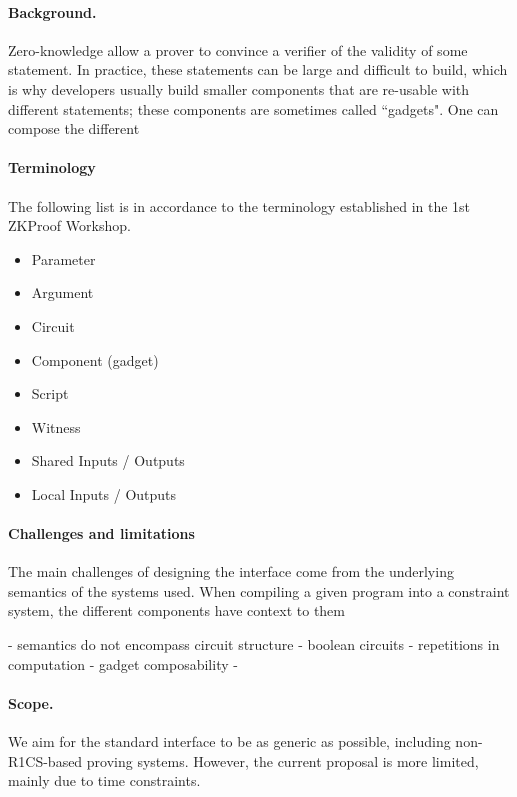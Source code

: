 \documentclass[a4paper,11pt]{article}
\begin{document}
		\paragraph{Background.} Zero-knowledge allow a prover to convince a verifier of the validity of some statement. In practice, these statements can be large and difficult to build, which is why developers usually build smaller components that are re-usable with different statements; these components are sometimes called ``gadgets". One can compose the different 
		
		
		\paragraph{Terminology}
		The following list is in accordance to the terminology established in the 1st ZKProof Workshop.
		
		\begin{itemize}
			\item Parameter
			\item Argument
			\item Circuit
			\item Component (gadget)
			\item Script
			\item Witness
			\item Shared Inputs / Outputs
			\item Local Inputs / Outputs
			
		\end{itemize}
		
		
		\paragraph{Challenges and limitations}
		
		The main challenges of designing the interface come from the underlying semantics of the systems used. When compiling a given program into a constraint system, the different components have context to them
		
		- semantics do not encompass circuit structure
			- boolean circuits
			- repetitions in computation
		- gadget composability
		- 
		
		\paragraph{Scope.} We aim for the standard interface to be as generic as possible, including non-R1CS-based proving systems. However, the current proposal is more limited, mainly due to time constraints.
		
\end{document}
